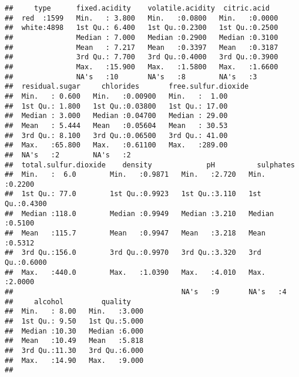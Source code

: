 \documentclass[]{article}
\begin{document}
\begin{verbatim}
##     type      fixed.acidity    volatile.acidity  citric.acid    
##  red  :1599   Min.   : 3.800   Min.   :0.0800   Min.   :0.0000  
##  white:4898   1st Qu.: 6.400   1st Qu.:0.2300   1st Qu.:0.2500  
##               Median : 7.000   Median :0.2900   Median :0.3100  
##               Mean   : 7.217   Mean   :0.3397   Mean   :0.3187  
##               3rd Qu.: 7.700   3rd Qu.:0.4000   3rd Qu.:0.3900  
##               Max.   :15.900   Max.   :1.5800   Max.   :1.6600  
##               NA's   :10       NA's   :8        NA's   :3       
##  residual.sugar     chlorides       free.sulfur.dioxide
##  Min.   : 0.600   Min.   :0.00900   Min.   :  1.00     
##  1st Qu.: 1.800   1st Qu.:0.03800   1st Qu.: 17.00     
##  Median : 3.000   Median :0.04700   Median : 29.00     
##  Mean   : 5.444   Mean   :0.05604   Mean   : 30.53     
##  3rd Qu.: 8.100   3rd Qu.:0.06500   3rd Qu.: 41.00     
##  Max.   :65.800   Max.   :0.61100   Max.   :289.00     
##  NA's   :2        NA's   :2                            
##  total.sulfur.dioxide    density             pH          sulphates     
##  Min.   :  6.0        Min.   :0.9871   Min.   :2.720   Min.   :0.2200  
##  1st Qu.: 77.0        1st Qu.:0.9923   1st Qu.:3.110   1st Qu.:0.4300  
##  Median :118.0        Median :0.9949   Median :3.210   Median :0.5100  
##  Mean   :115.7        Mean   :0.9947   Mean   :3.218   Mean   :0.5312  
##  3rd Qu.:156.0        3rd Qu.:0.9970   3rd Qu.:3.320   3rd Qu.:0.6000  
##  Max.   :440.0        Max.   :1.0390   Max.   :4.010   Max.   :2.0000  
##                                        NA's   :9       NA's   :4       
##     alcohol         quality     
##  Min.   : 8.00   Min.   :3.000  
##  1st Qu.: 9.50   1st Qu.:5.000  
##  Median :10.30   Median :6.000  
##  Mean   :10.49   Mean   :5.818  
##  3rd Qu.:11.30   3rd Qu.:6.000  
##  Max.   :14.90   Max.   :9.000  
## 
\end{verbatim}
\end{document}
